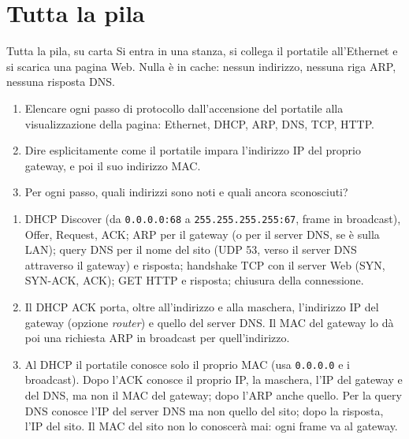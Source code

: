 \section{Tutta la pila}

\begin{esercizio}{Tutta la pila, su carta}
Si entra in una stanza, si collega il portatile all'Ethernet e si scarica una pagina Web. Nulla è in cache: nessun indirizzo, nessuna riga
ARP, nessuna risposta DNS.
\begin{enumerate}[label=(\alph*)]
    \item Elencare ogni passo di protocollo dall'accensione del portatile alla visualizzazione della pagina: Ethernet, DHCP, ARP, DNS, TCP,
          HTTP.
    \item Dire esplicitamente come il portatile impara l'indirizzo IP del proprio gateway, e poi il suo indirizzo MAC.
    \item Per ogni passo, quali indirizzi sono noti e quali ancora sconosciuti?
\end{enumerate}

\svolgimento
\begin{enumerate}[label=(\alph*)]
    \item DHCP Discover (da \texttt{0.0.0.0:68} a \texttt{255.255.255.255:67}, frame in broadcast), Offer, Request, ACK; ARP per il gateway
          (o per il server DNS, se è sulla LAN); query DNS per il nome del sito (UDP 53, verso il server DNS attraverso il gateway) e
          risposta; handshake TCP con il server Web (SYN, SYN-ACK, ACK); GET HTTP e risposta; chiusura della connessione.
    \item Il DHCP ACK porta, oltre all'indirizzo e alla maschera, l'indirizzo IP del gateway (opzione \emph{router}) e quello del server
          DNS. Il MAC del gateway lo dà poi una richiesta ARP in broadcast per quell'indirizzo.
    \item Al DHCP il portatile conosce solo il proprio MAC (usa \texttt{0.0.0.0} e i broadcast). Dopo l'ACK conosce il proprio IP, la maschera,
          l'IP del gateway e del DNS, ma non il MAC del gateway; dopo l'ARP anche quello. Per la query DNS conosce l'IP del server DNS ma non
          quello del sito; dopo la risposta, l'IP del sito. Il MAC del sito non lo conoscerà mai: ogni frame va al gateway.
\end{enumerate}
\end{esercizio}

